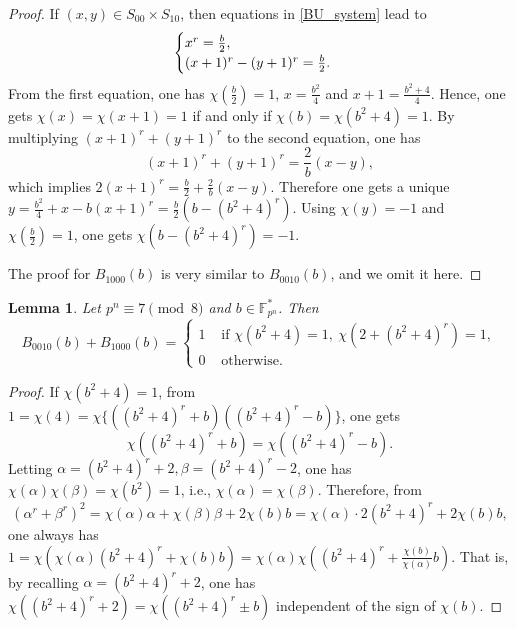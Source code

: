 \documentclass[11pt]{article}
\numberwithin{theorem}{section}
\newtheorem{lemma}[theorem]{Lemma}
\newcommand{\Fpnmul}{\mathbb{F}_{p^n}^*}
\begin{document}
\begin{proof}
If $(x,y)\in S_{00}\times S_{10}$, then equations in \eqref{BU_system} lead to 
\begin{equation}\notag
	\begin{cases}
		x^r=\frac{b}{2},\\
		(x+1)^r-(y+1)^r=\frac{b}{2}.
	\end{cases}
\end{equation} 
From the first equation, one has $\chi\left(\frac b 2 \right)=1$, $x = \frac{b^2}{4}$ and $x+1 = \frac{b^2 +4}{4}$. Hence, one gets $\chi(x) = \chi(x+1) = 1$ if and only if $\chi(b) = \chi(b^2+4) = 1$.
By multiplying $(x+1)^r+(y+1)^r$ to the second equation, one has 
$$(x+1)^r+(y+1)^r=\frac{2}{b}(x-y), $$
which implies $2(x+1)^r=\frac{b}{2}+\frac{2}{b}(x-y)$. Therefore one gets  a unique $y=\frac{b^2}{4}+x-b(x+1)^r=\frac{b}{2}(b-(b^2+4)^r)$. Using $\chi(y)=-1$ and $\chi\left( \frac{b}{2} \right)=1$, one gets $\chi(b-(b^2+4)^r)=-1$. 

The proof for $B_{1000}(b)$ is very similar to $B_{0010}(b)$, and we omit it here.
\end{proof}



\begin{lemma}\label{BU_lemma S10+}
	Let $p^n\equiv 7\pmod{8}$ and $b\in \Fpnmul$. Then
	\begin{equation}\label{BU10}
		B_{0010}(b)+B_{1000}(b)=
		\begin{cases}
			1 &\text{ if }\chi(b^2+4)=1,\ \chi(2+(b^2+4)^r)=1,\\
			0 &\text{ otherwise.}
		\end{cases}
	\end{equation}
\end{lemma}

\begin{proof}
If $\chi(b^2+4)=1$, from $1=\chi(4)=\chi\{((b^2+4)^r+b)((b^2+4)^r-b)\}$, one gets 
$$\chi((b^2+4)^r+b)=\chi((b^2+4)^r-b).$$
Letting $\alpha=(b^2+4)^r+2, \beta=(b^2+4)^r-2$, one has $\chi(\alpha)\chi(\beta)=\chi(b^2)=1$, i.e., $\chi(\alpha)=\chi(\beta)$. Therefore, from 
$$
(\alpha^r+\beta^r)^2=\chi(\alpha)\alpha+\chi(\beta)\beta+2\chi(b)b=\chi(\alpha)\cdot 2(b^2+4)^r+2\chi(b)b,
$$
one always has  $1=\chi\left(\chi(\alpha) (b^2+4)^r+\chi(b)b\right)=\chi(\alpha)\chi\left((b^2+4)^r+\frac{\chi(b)}{\chi(\alpha)}b\right)$. That is, by recalling $\alpha=(b^2+4)^r+2$, one has $\chi((b^2+4)^r+2)=\chi((b^2+4)^r\pm b)$ independent of the sign of $\chi(b)$.
\end{proof}
\end{document}
